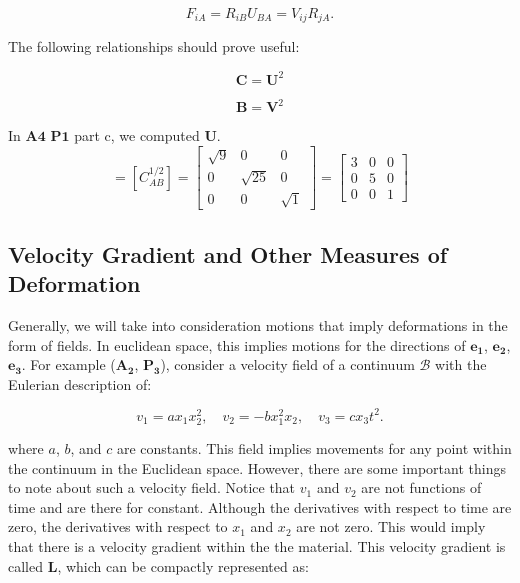 \documentclass[a4paper]{article}
\begin{document}
\begin{equation}
    F_{iA} = R_{iB}U_{BA} = V_{ij}R_{jA}. 
\end{equation}

The following relationships should prove useful:

\begin{equation}
    \mathbf{C} = \mathbf{U}^2
\end{equation}

\begin{equation}
    \mathbf{B} = \mathbf{V}^2
\end{equation}

In $\mathbf{A4}$ $\mathbf{P1}$ part c, we computed $\mathbf{U}$. 
\begin{equation*}
    [U_{AB}] = [C_{AB}^{1/2}] = 
    \begin{bmatrix}
      \sqrt{9} & 0 & 0 \\
      0 & \sqrt{25} & 0 \\
      0 & 0 & \sqrt{1}
    \end{bmatrix}
    = 
    \begin{bmatrix}
      3 & 0 & 0 \\
      0 & 5 & 0 \\
      0 & 0 & 1
    \end{bmatrix}
\end{equation*}
\subsection{Velocity Gradient and Other Measures of Deformation}

Generally, we will take into consideration motions that imply deformations in the form of fields. In euclidean space, this implies motions for the directions of $\mathbf{e_1}$, $\mathbf{e_2}$, $\mathbf{e_3}$. For example ($\mathbf{A_2}$, $\mathbf{P_3}$), consider a velocity field of a continuum $\mathcal{B}$ with the Eulerian description of: 

\begin{equation*}
    v_1 = ax_1x_2^2, \quad v_2 = -b x_1^2 x_2, \quad v_3 = c x_3 t^2 . 
\end{equation*}

where $a$, $b$, and $c$ are constants. This field implies movements for any point within the continuum in the Euclidean space. However, there are some important things to note about such a velocity field. Notice that $v_1$ and $v_2$ are not functions of time and are there for constant. Although the derivatives with respect to time are zero, the derivatives with respect to $x_1$ and $x_2$ are not zero. This would imply that there is a velocity gradient within the the material. This velocity gradient is called $\mathbf{L}$, which can be compactly represented as:
\end{document}
